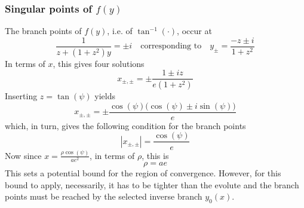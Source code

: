 \documentclass[a4paper]{amsart}
\begin{document}
\subsubsection{Singular points of $f(y)$}\label{sec:singular_points_f}
The branch points of $f(y)$, i.e. of $\tan^{-1}(\cdot)$, occur at
\begin{equation*}
\frac{1}{z +(1+z^2)y}=\pm i\quad\text{corresponding to}\quad y_\pm=\frac{-z\pm i}{1+z^2}
\end{equation*}
In terms of $x$, this gives four solutions
\begin{equation*}
x_{\pm,\pm}=\pm\frac{1\pm iz}{e(1+z^2)}
\end{equation*}
Inserting $z=\tan(\psi)$ yields
\begin{equation*}
x_{\pm,\pm}=\pm\frac{\cos(\psi)\bigl(\cos(\psi) \pm i\sin(\psi)\bigr)}{e}
\end{equation*}
which, in turn, gives the following condition for the branch points
\begin{equation*}
|x_{\pm,\pm}|=\frac{\cos(\psi)}{e}
\end{equation*}
Now since $x=\frac{\rho\cos(\psi)}{ae^2}$, in terms of $\rho$, this is
\begin{equation}\label{eq:ae_bound}
\rho = ae
\end{equation}
This sets a potential bound for the region of convergence.
However, for this bound to apply, necessarily, it has to be tighter than the evolute and the branch points must be reached by the selected inverse branch $y_0(x)$. %
\end{document}
